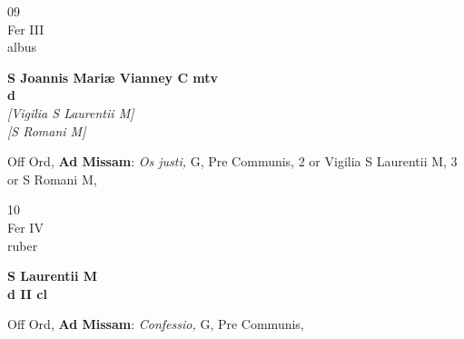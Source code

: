 \documentclass[10pt, openany]{book}
\begin{document}
        \begin{center}
            \begin{minipage}{3.5in}
                \vspace{2em}
                \begin{minipage}{0.5in}
                    {\Huge 09} \\
                    {\normalsize Fer III} \\
                    {\normalsize albus}
                \end{minipage}
                \begin{minipage}{3.0in}
                    \textbf{ \large S Joannis Mariæ Vianney C mtv \\
                    \textnormal{\normalsize d}} \\ \textit{[Vigilia S Laurentii M]} \\ \textit{[S Romani M]} \\ 
                \end{minipage}
                \begin{justify}Off Ord, \textbf{Ad Missam}: \textit{Os justi,} G, Pre Communis, 2 or Vigilia S Laurentii M, 3 or S Romani M,  
                \end{justify}
            \end{minipage}
        \end{center}
    
        \begin{center}
            \begin{minipage}{3.5in}
                \vspace{2em}
                \begin{minipage}{0.5in}
                    {\Huge 10} \\
                    {\normalsize Fer IV} \\
                    {\normalsize ruber}
                \end{minipage}
                \begin{minipage}{3.0in}
                    \textbf{ \large S Laurentii M \\
                    \textnormal{\normalsize d II cl}} \\ 
                \end{minipage}
                \begin{justify}Off Ord, \textbf{Ad Missam}: \textit{Confessio,} G, Pre Communis,  
                \end{justify}
            \end{minipage}
        \end{center}
    
\end{document}
